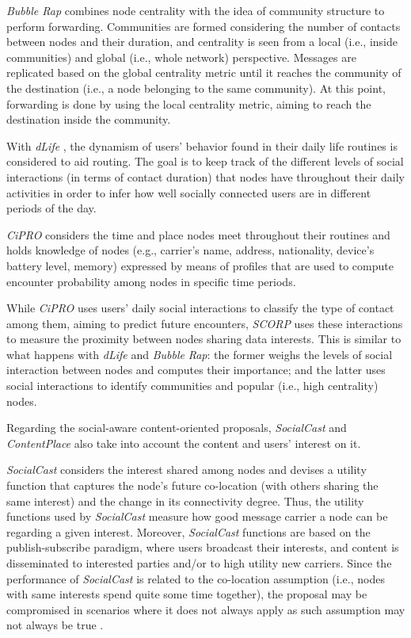 \documentclass[lnicst]{svmultln}
\begin{document}
\textit{Bubble Rap} combines node centrality with the idea of community
structure to perform forwarding. Communities are formed considering
the number of contacts between nodes and their duration, and centrality
is seen from a local (i.e., inside communities) and global (i.e.,
whole network) perspective. Messages are replicated based on the global
centrality metric until it reaches the community of the destination
(i.e., a node belonging to the same community). At this point, forwarding
is done by using the local centrality metric, aiming to reach the
destination inside the community. 

With \emph{dLife} , the dynamism of users' behavior found in their
daily life routines is considered to aid routing. The goal is to keep
track of the different levels of social interactions (in terms of
contact duration) that nodes have throughout their daily activities
in order to infer how well socially connected users are in different
periods of the day. 

\emph{CiPRO} considers the time and place nodes meet throughout their
routines and\emph{ }holds knowledge of nodes (e.g., carrier's name,
address, nationality, device's battery level, memory) expressed by
means of profiles that are used to compute encounter probability among
nodes in specific time periods. 

While \emph{CiPRO} uses users' daily social interactions to classify
the type of contact among them, aiming to predict future encounters,
\emph{SCORP} uses these interactions to measure the proximity between
nodes sharing data interests. This is similar to what happens with
\emph{dLife} and \emph{Bubble} \emph{Rap}: the former weighs the levels
of social interaction between nodes and computes their importance;
and the latter uses social interactions to identify communities and
popular (i.e., high centrality) nodes.

Regarding the social-aware content-oriented proposals, \emph{SocialCast}
\cite{socialcast} and \emph{ContentPlace} \cite{contentplace} also
take into account the content and users' interest on it. 

\textit{SocialCast} considers the interest shared among nodes and
devises a utility function that captures the node's future co-location
(with others sharing the same interest) and the change in its connectivity
degree. Thus, the utility functions used by \emph{SocialCast} measure
how good message carrier a node can be regarding a given interest.
Moreover, \textit{SocialCast} functions are based on the publish-subscribe
paradigm, where users broadcast their interests, and content is disseminated
to interested parties and/or to high utility new carriers. Since the
performance of \emph{SocialCast} is related to the co-location assumption
(i.e., nodes with same interests spend quite some time together),
the proposal may be compromised in scenarios where it does not always
apply as such assumption may not always be true \cite{people}.
\end{document}
